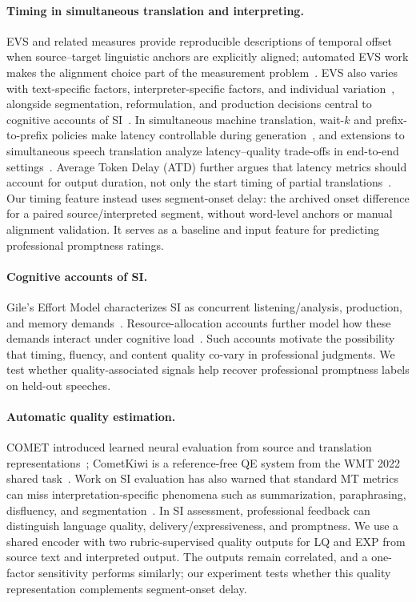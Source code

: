 \paragraph{Timing in simultaneous translation and interpreting.}
EVS and related measures provide reproducible descriptions of temporal offset when source--target linguistic anchors are explicitly aligned; automated EVS work makes the alignment choice part of the measurement problem~\citep{guo2024manual}. EVS also varies with text-specific factors, interpreter-specific factors, and individual variation~\citep{janikowski2025evs}, alongside segmentation, reformulation, and production decisions central to cognitive accounts of SI~\citep{gile1995effort,seeber2011cognitive}. In simultaneous machine translation, wait-$k$ and prefix-to-prefix policies make latency controllable during generation~\citep{ma2019stacl}, and extensions to simultaneous speech translation analyze latency--quality trade-offs in end-to-end settings~\citep{ma2020simulst}. Average Token Delay (ATD) further argues that latency metrics should account for output duration, not only the start timing of partial translations~\citep{kano2023atd}. Our timing feature instead uses segment-onset delay: the archived onset difference for a paired source/interpreted segment, without word-level anchors or manual alignment validation. It serves as a baseline and input feature for predicting professional promptness ratings.

\paragraph{Cognitive accounts of SI.}
Gile's Effort Model characterizes SI as concurrent listening/analysis, production, and memory demands~\citep{gile1995effort}. Resource-allocation accounts further model how these demands interact under cognitive load~\citep{seeber2011cognitive,seeber2012cognitive}. Such accounts motivate the possibility that timing, fluency, and content quality co-vary in professional judgments. We test whether quality-associated signals help recover professional promptness labels on held-out speeches.

\paragraph{Automatic quality estimation.}
COMET introduced learned neural evaluation from source and translation representations~\citep{rei2020comet}; CometKiwi is a reference-free QE system from the WMT 2022 shared task~\citep{rei-etal-2022-cometkiwi}. Work on SI evaluation has also warned that standard MT metrics can miss interpretation-specific phenomena such as summarization, paraphrasing, disfluency, and segmentation~\citep{wein2024barriers}. In SI assessment, professional feedback can distinguish language quality, delivery/expressiveness, and promptness. We use a shared encoder with two rubric-supervised quality outputs for LQ and EXP from source text and interpreted output. The outputs remain correlated, and a one-factor sensitivity performs similarly; our experiment tests whether this quality representation complements segment-onset delay.

